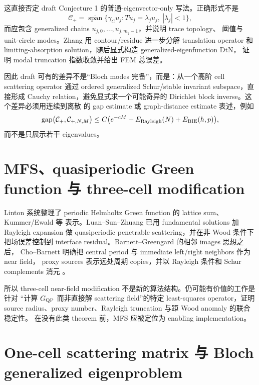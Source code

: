\documentclass[UTF8,11pt,fontset=none]{ctexart}
\begin{document}
这直接否定 draft Conjecture 1 的普通-eigenvector-only 写法。正确形式不是
\begin{equation}
  \mathcal C_+ = \overline{\operatorname{span}}
  \{\gamma_C u_j:T u_j=\lambda_j u_j,\ |\lambda_j|<1\},
\end{equation}
而应包含 generalized chains \(u_{j,0},\ldots,u_{j,m_j-1}\)，并说明 trace topology、
阈值与 unit-circle modes。Zhang 用 contour/residue 进一步分解 translation operator 和
limiting-absorption solution\cite{Zhang2021}，随后显式构造 generalized-eigenfunction DtN，
证明 modal truncation 指数收敛并给出 FEM 总误差\cite{Zhang2023}。

因此 draft 可有的差异不是“Bloch modes 完备”，而是：从一个高阶 cell scattering
operator 通过 ordered generalized Schur/stable invariant subspace，直接形成 Cauchy
relation，避免显式求一个可能奇异的 Dirichlet block inverse。这个差异必须用连续到离散
的 gap estimate 或 graph-distance estimate 表述，例如
\begin{equation}
  \operatorname{gap}\bigl(\mathcal C_+,
  \mathcal C_{+,N,M}\bigr)
  \le C\bigl(e^{-cM}+E_{\rm Rayleigh}(N)+E_{\rm BIE}(h,p)\bigr),
\end{equation}
而不是只展示若干 eigenvalues。

\section{MFS、quasiperiodic Green function 与 three-cell modification}

Linton 系统整理了 periodic Helmholtz Green function 的 lattice sum、Kummer/Ewald 等
表示\cite{Linton1998}。Luan--Sun--Zhuang 已用 fundamental solutions 加 Rayleigh
expansion 做 quasiperiodic penetrable scattering，并在非 Wood 条件下把场误差控制到
interface residual\cite{LuanSunZhuang2019}。Barnett--Greengard 的相邻 images 思想之后，
Cho--Barnett 明确把 central period 与 immediate left/right neighbors 作为 near field，
proxy sources 表示远处周期 copies，并以 Rayleigh 条件和 Schur complements 消元
\cite{ChoBarnett2015}。

所以 three-cell near-field modification 不是新的算法结构。仍可能有价值的工作是针对
“计算 \(G_{\rm QP}\) 而非直接解 scattering field”的特定 least-squares operator，证明
source radius、proxy number、Rayleigh truncation 与距 Wood anomaly 的联合稳定性。
在没有此类 theorem 前，MFS 应被定位为 enabling implementation。

\section{One-cell scattering matrix 与 Bloch generalized eigenproblem}
\end{document}
